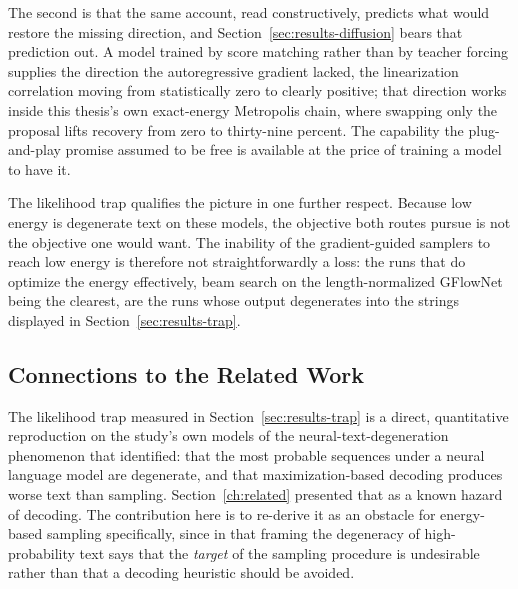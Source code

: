 The second is that the same account, read constructively, predicts what would restore the missing direction, and Section~\ref{sec:results-diffusion} bears that prediction out. A model trained by score matching rather than by teacher forcing supplies the direction the autoregressive gradient lacked, the linearization correlation moving from statistically zero to clearly positive; that direction works inside this thesis's own exact-energy Metropolis chain, where swapping only the proposal lifts recovery from zero to thirty-nine percent. The capability the plug-and-play promise assumed to be free is available at the price of training a model to have it.

The likelihood trap qualifies the picture in one further respect. Because low energy is degenerate text on these models, the objective both routes pursue is not the objective one would want. The inability of the gradient-guided samplers to reach low energy is therefore not straightforwardly a loss: the runs that do optimize the energy effectively, beam search on the length-normalized GFlowNet being the clearest, are the runs whose output degenerates into the strings displayed in Section~\ref{sec:results-trap}.

\subsection{Connections to the Related Work}
\label{sec:disc-related}

The likelihood trap measured in Section~\ref{sec:results-trap} is a direct, quantitative reproduction on the study's own models of the neural-text-degeneration phenomenon that \citet{holtzman2020curious} identified: that the most probable sequences under a neural language model are degenerate, and that maximization-based decoding produces worse text than sampling. Section~\ref{ch:related} presented that as a known hazard of decoding. The contribution here is to re-derive it as an obstacle for energy-based sampling specifically, since in that framing the degeneracy of high-probability text says that the \emph{target} of the sampling procedure is undesirable rather than that a decoding heuristic should be avoided.

